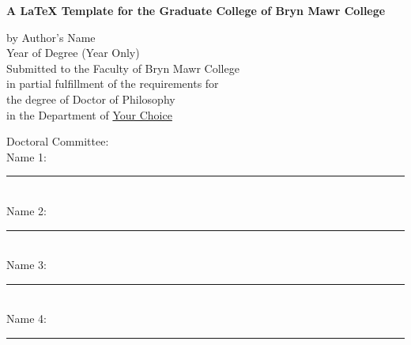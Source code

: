 \thispagestyle{plain}
\begin{titlepage}
    
        \begin{center}
            \vspace*{1in}
            \textbf{A LaTeX Template for the Graduate College of Bryn Mawr College}
            \vspace{2.0in} 
        
            by Author's Name\\
            Year of Degree (Year Only)\\
            \vspace{1.0in}
            \singlespace
            Submitted to the Faculty of Bryn Mawr College\\
            in partial fulfillment of the requirements for\\
            the degree of Doctor of Philosophy\\
            in the Department of \underline{Your Choice}
        
        \end{center}
        \singlespace
        \begin{samepage}
        \vspace{1.0in} 
        \begin{flushleft}
        Doctoral Committee:\\
        \bigskip
        Name 1:~\rule{4cm}{0.15mm}\\
        Name 2:~\rule{4cm}{0.15mm}\\
        Name 3:~\rule{4cm}{0.15mm}\\
        Name 4:~\rule{4cm}{0.15mm}
        \end{flushleft}
   \end{samepage}
\end{titlepage}